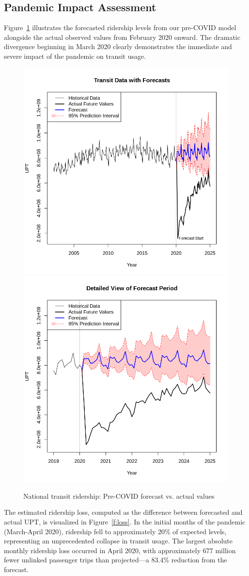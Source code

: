 \documentclass[11pt]{article}
\begin{document}
\subsection{Pandemic Impact Assessment}

Figure~\ref{f:forecast} illustrates the forecasted ridership levels from our pre-COVID model alongside the actual observed values from February 2020 onward. The dramatic divergence beginning in March 2020 clearly demonstrates the immediate and severe impact of the pandemic on transit usage.

\begin{figure}[!ht]
\centering
\includegraphics[width=0.485\linewidth]{pre_forecast.png}
\includegraphics[width=0.485\linewidth]{pre_forecast_close.png}
\caption{National transit ridership: Pre-COVID forecast vs. actual values}
\label{f:forecast}
\end{figure}

The estimated ridership loss, computed as the difference between forecasted and actual UPT, is visualized in Figure~\ref{f:loss}. In the initial months of the pandemic (March-April 2020), ridership fell to approximately 20\% of expected levels, representing an unprecedented collapse in transit usage. The largest absolute monthly ridership loss occurred in April 2020, with approximately 677 million fewer unlinked passenger trips than projected—a 83.4\% reduction from the forecast.
\end{document}
